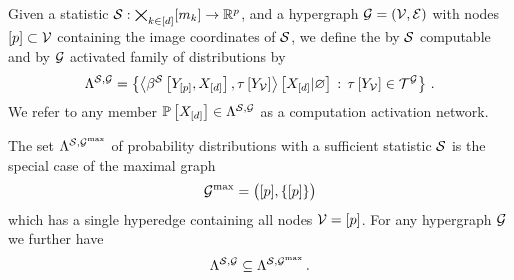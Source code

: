 \begin{definition}
    \label{def:realizableStatDistributions}
    Given a statistic $\mathcal{S} : \bigtimes_{k\in[d]}[m_{k}] \rightarrow \mathbb{R}^{p}$, and a hypergraph $\mathcal{G}=(\mathcal{V},\mathcal{E})$ with nodes $[p]\subset\mathcal{V}$ containing the image coordinates of $\mathcal{S}$, we define the by $\mathcal{S}$ computable and by $\mathcal{G}$ activated family of distributions by
    \begin{align*}
        \realizabledistsof{\sstat,\graph}
        = \left\{ \normalizationof{\bencodingofat{\sstat}{\sstatcatof{[\seldim]},\shortcatvariables},\hypercoreat{\headvariableof{\nodes}} %
        }{\shortcatvariables}
        \wcols \hypercoreat{\headvariableof{\nodes}} \in \tnsetof{\graph} \right\} \, .
    \end{align*}
    We refer to any member $\mathbb{P}\left[X_{[d]}\right]\in\Lambda^{\mathcal{S},\mathcal{G}}$ as a computation activation network.
\end{definition}

The set $\Lambda^{\mathcal{S},\mathcal{G}^{\mathrm{max}}}$ of probability distributions with a sufficient statistic $\mathcal{S}$ is the special case of the maximal graph
\begin{align*}
    \mathcal{G}^{\mathrm{max}} = \big([p],\{[p]\}\big)
\end{align*}
which has a single hyperedge containing all nodes $\mathcal{V}=[p]$.
For any hypergraph $\mathcal{G}$ we further have
\begin{align*}
    \Lambda^{\mathcal{S},\mathcal{G}} \subseteq \Lambda^{\mathcal{S},\mathcal{G}^{\mathrm{max}}} \, .
\end{align*}


